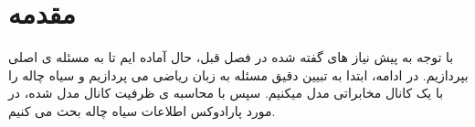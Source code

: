 \section{مقدمه}
با توجه به پیش نیاز های گفته شده در فصل قبل، حال آماده ایم تا به مسئله ی اصلی بپردازیم. در ادامه، ابتدا به تبیین دقیق مسئله به زبان ریاضی می پردازیم و سیاه چاله را با یک کانال مخابراتی مدل میکنیم. سپس با محاسبه ی ظرفیت کانال مدل شده، در مورد پارادوکس اطلاعات سیاه چاله بحث می کنیم.